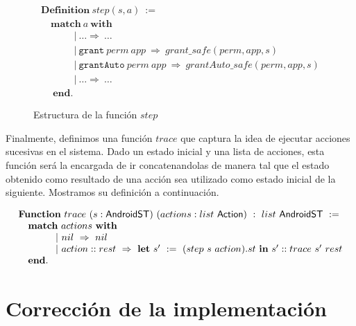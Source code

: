 \begin{figure}[ht]
    \begin{displaymath}
        \begin{array}{l}
            \textbf{Definition}\ step(s,a)\ :=\                                                               \\
            \quad \textbf{match}\ a\ \textbf{with}                                                            \\
            \quad  \hspace{1cm} |\ \ldots \Rightarrow\ \ldots                                                 \\
            \quad  \hspace{1cm} |\  \texttt{grant}\ perm\ app\ \Rightarrow\ grant\_safe(perm, app, s)         \\
            \quad  \hspace{1cm} |\  \texttt{grantAuto}\ perm\ app\ \Rightarrow\ grantAuto\_safe(perm, app, s) \\
            \quad  \hspace{1cm} |\ \ldots \Rightarrow\ \ldots                                                 \\
            \quad\ \textbf{end}.
        \end{array}
    \end{displaymath}
    \caption{Estructura de la función $step$}
    \label{fig:step}
\end{figure}

Finalmente, definimos una función $trace$ que captura la idea de ejecutar acciones sucesivas en el
sistema. Dado un estado inicial y una lista de acciones, esta función será la encargada de ir
concatenandolas de manera tal que el estado obtenido como resultado de una acción sea utilizado como
estado inicial de la siguiente. Mostramos su definición a continuación.

\begin{displaymath}
    \begin{array}{l}
        \textbf{Function}\ trace\ (s:\AndroidState)\ (actions:list\ \Action)\ :\ list\ \AndroidState \ :=                             \\
        \quad \textbf{match}\ actions\ \textbf{with}                                                                                  \\
        \quad \hspace{1cm} |\ nil\ \Rightarrow\ nil                                                                                   \\
        \quad \hspace{1cm} |\ action::rest\ \Rightarrow\ \textbf{let}\ s'\ :=\ (step\ s\ action).st\ \textbf{in}\ s'::trace\ s'\ rest \\
        \quad \textbf{end}.
    \end{array}
\end{displaymath}

\section{Corrección de la implementación}